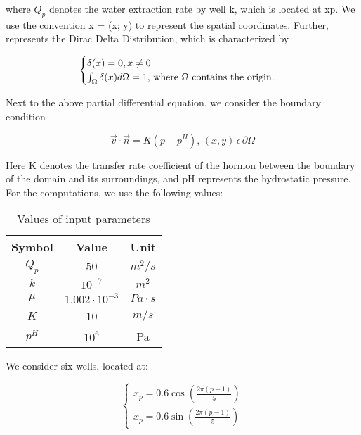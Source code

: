 \documentclass{report}
\begin{document}
where $Q_p$ denotes the water extraction rate by well k, which is located at xp. We use the convention x = (x; y) to represent the spatial coordinates. Further,  represents the Dirac Delta Distribution, which is characterized by

\begin{equation}
	\begin{cases} 
		\delta(x) = 0,x \neq 0 \\ \int_{\Omega}\delta(x)d\Omega = 1,$  where $\Omega $  contains the origin.$
	\end{cases} 
\end{equation}

\medskip
Next to the above partial differential equation, we consider the boundary condition 

\begin{equation}
	\vec{v}\cdot\vec{n}=K(p-p^H), \, (x,y)\, \epsilon\,  \partial\Omega
\end{equation}
\bigskip

Here K denotes the transfer rate coefficient of the hormon between the boundary of the domain and its surroundings, and pH represents the hydrostatic pressure. For the computations, we use the following values:


\begin{table}[ht]
	\caption{Values of input parameters} %
	\centering %
	\begin{tabular}{c c c} %
		\hline\hline %
		Symbol & Value & Unit\\ [0.5ex] %
		\hline %
		$Q_p$ & $50$ & $m^2/s$ \\ %
		$k$ & $10^{-7}$ & $m^2$ \\
		$\mu$ & $1.002\cdot 10^{-3}$ & $Pa\cdot s$ \\
		$K$ & 10 & $m/s$ \\
		$p^H$ & $10^6$ & Pa \\ [1ex] %
		\hline %
	\end{tabular}
	\label{table:nonlin} %
\end{table}
\bigskip

We consider six wells, located at:


\begin{equation}
	\begin{cases} 
		x_p=0.6\cos(\frac{2\pi (p-1)}{5}) \\ x_p=0.6\sin(\frac{2\pi (p-1)}{5})
	\end{cases} 
\end{equation}
\end{document}
